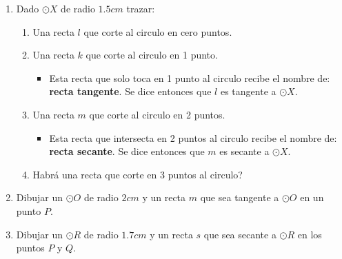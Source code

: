\begin{act_clase}
\begin{enumerate}
		
		\item Dado $\odot X$ de radio $1.5cm$ trazar:
		\begin{enumerate}[label=\Alph*)]
				\item Una recta $l$ que corte al circulo en cero puntos. \vspace{5cm}
				\item Una recta $k$ que corte al circulo en 1 punto. \vspace{5cm}
						\begin{itemize}
							\item Esta recta que solo toca en 1 punto al circulo recibe el nombre de: \textbf{recta tangente}. Se dice entonces que $l$ es tangente a $\odot X$.
						\end{itemize}
				\item Una recta $m$ que corte al circulo en 2 puntos. \vspace{5cm}
						\begin{itemize}
							\item Esta recta que intersecta en 2 puntos al circulo recibe el nombre de: \textbf{recta secante}. Se dice entonces que $m$ es secante a $\odot X$.
						\end{itemize}
				\item Habrá una recta que corte en 3 puntos al circulo?
		\end{enumerate}
		\item Dibujar un $\odot O$ de radio $2cm$ y un recta $m$ que sea tangente a $\odot O$ en un punto $P$.\vspace{5cm}
		\item Dibujar un $\odot R$ de radio $1.7cm$ y un recta $s$ que sea secante a $\odot R$ en los puntos $P$ y $Q$. \vspace{5cm}
		

\end{enumerate}
\end{act_clase}

